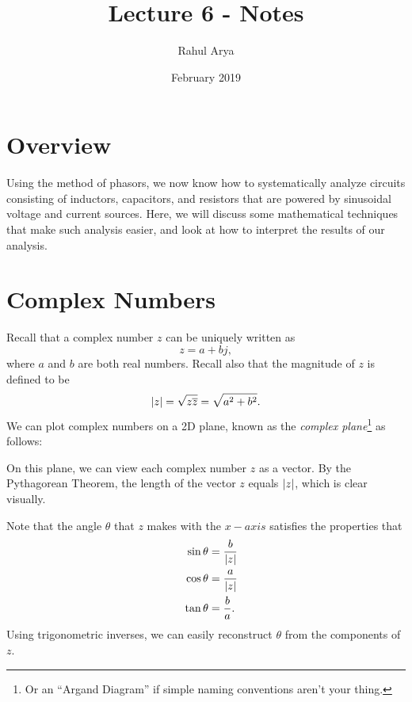 \documentclass[letterpaper]{article}
\title{Lecture 6 - Notes}
\author{Rahul Arya}
\date{February 2019}
\theoremstyle{remark}
\DeclarePairedDelimiter\abs{\lvert}{\rvert}%
\newcommand{\eqn}[1]{\begin{alignat*}{2}#1\end{alignat*}}
\begin{document}
\maketitle

\section{Overview}
Using the method of phasors, we now know how to systematically analyze circuits consisting of inductors, capacitors, and resistors that are powered by sinusoidal voltage and current sources. Here, we will discuss some mathematical techniques that make such analysis easier, and look at how to interpret the results of our analysis.

\section{Complex Numbers}
Recall that a complex number $z$ can be uniquely written as
\[
    z = a + bj,
\]
where $a$ and $b$ are both real numbers. Recall also that the magnitude of $z$ is defined to be
\[
    \abs{z} = \sqrt{z\overline{z}} = \sqrt{a^2 + b^2}.
\]
We can plot complex numbers on a 2D plane, known as the \emph{complex plane}\footnote{Or an ``Argand Diagram'' if simple naming conventions aren't your thing.} as follows:
\begin{center}
\end{center}
On this plane, we can view each complex number $z$ as a vector. By the Pythagorean Theorem, the length of the vector $z$ equals $\abs{z}$, which is clear visually.

Note that the angle $\theta$ that $z$ makes with the $x-axis$ satisfies the properties that
\eqn{
    && \sin{\theta} &= \frac{b}{\abs{z}} \\
    && \cos{\theta} &= \frac{a}{\abs{z}} \\
    && \tan{\theta} &= \frac{b}{a}. \\
}
Using trigonometric inverses, we can easily reconstruct $\theta$ from the components of $z$.
\end{document}
